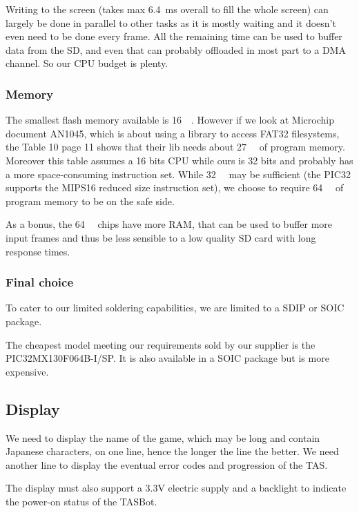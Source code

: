 \documentclass[a4paper,oneside,12pt]{article}
\begin{document}
Writing to the screen (takes max \SI{6.4}{\ms} overall to fill the whole
screen) can largely be done in parallel to other tasks as it is mostly waiting
and it doesn't even need to be done every frame. All the remaining time can be
used to buffer data from the SD, and even that can probably offloaded in most
part to a DMA channel. So our CPU budget is plenty.

\subsubsection{Memory}

The smallest flash memory available is \SI{16}{\kibi\byte}. However if we look
at Microchip document AN1045, which is about using a library to access FAT32
filesystems, the Table 10 page 11 shows that their lib needs about
\SI{27}{\kibi\byte} of program memory. Moreover this table assumes a 16 bits CPU
while ours is 32 bits and probably has a more space-consuming instruction
set. While \SI{32}{\kibi\byte} may be sufficient (the PIC32 supports the MIPS16
reduced size instruction set), we choose to require \SI{64}{\kibi\byte} of
program memory to be on the safe side.

As a bonus, the \SI{64}{\kibi\byte} chips have more RAM, that can be used to
buffer more input frames and thus be less sensible to a low quality SD card with
long response times.

\subsubsection{Final choice}

To cater to our limited soldering capabilities, we are limited to a SDIP or
SOIC package.

The cheapest model meeting our requirements sold by our supplier is the
PIC32MX130F064B-I/SP. It is also available in a SOIC package but is more
expensive.

\subsection{Display}
We need to display the name of the game, which may be long and contain Japanese
characters, on one line, hence the longer the line the better. We need another
line to display the eventual error codes and progression of the TAS.

The display must also support a 3.3V electric supply and a backlight to indicate
the power-on status of the TASBot.
\end{document}
